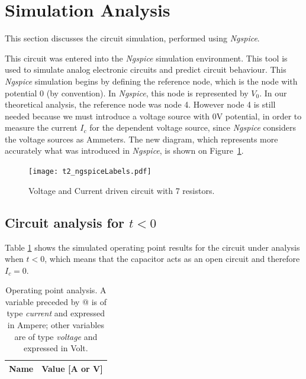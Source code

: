 \pagebreak
\section{Simulation Analysis}
\label{sec:simulation}

\indent

This section discusses the circuit simulation, performed using {\it Ngspice}. 

This circuit was entered into the {\it Ngspice} simulation environment. This tool is used to simulate analog electronic circuits and predict circuit behaviour. 
This {\it Ngspice} simulation begins by defining the reference node, which is the node with potential 0 (by convention). In {\it Ngspice}, this node is represented by $V_0$. In our theoretical analysis, the reference node was node 4. However node 4 is still needed because we must introduce a voltage source with 0V potential, in order to measure the current $I_c$ for the dependent voltage source, since {\it Ngspice} considers the voltage sources as Ammeters.
The new diagram, which represents more accurately what was introduced in {\it Ngspice}, is shown on Figure~\ref{fig:ngspiceCircuit}.

\begin{figure}[H] \centering
    \texttt{[image: t2\_ngspiceLabels.pdf]}
    \caption{Voltage and Current driven circuit with 7 resistors.}
    \label{fig:ngspiceCircuit}
\end{figure}



\subsection{Circuit analysis for $t<0$}

\indent

Table \ref{tab:OpNg} shows the simulated operating point results for the circuit
under analysis when $t<0$, which means that the capacitor acts as an open circuit and therefore $I_c=0$.
\begin{table}[H]
  \centering
  \begin{tabular}{|l|r|}
    \hline    
    {\bf Name} & {\bf Value [A or V]} \\ \hline
    
  \end{tabular}
  \caption{Operating point analysis. A variable preceded by @ is of type {\em current}
    and expressed in Ampere; other variables are of type {\it voltage} and expressed in
    Volt.}
  \label{tab:OpNg}
\end{table}


